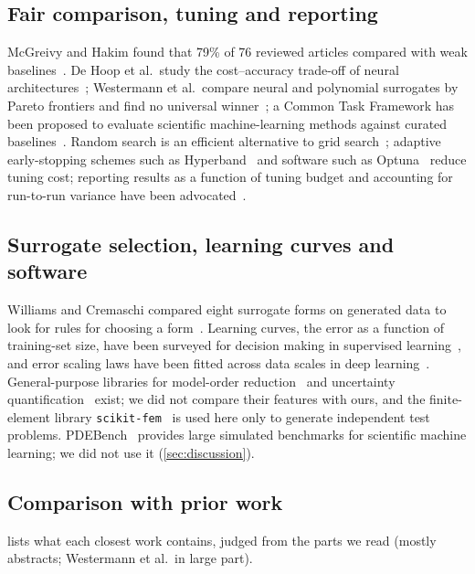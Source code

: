 \subsection{Fair comparison, tuning and reporting}
McGreivy and Hakim found that 79\% of 76 reviewed articles compared with weak baselines~\cite{mcgreivy2024}. De Hoop et al.\ study the cost--accuracy trade-off of neural architectures~\cite{dehoop2022}; Westermann et al.\ compare neural and polynomial surrogates by Pareto frontiers and find no universal winner~\cite{westermann2026}; a Common Task Framework has been proposed to evaluate scientific machine-learning methods against curated baselines~\cite{wyder2025}. Random search is an efficient alternative to grid search~\cite{bergstra2012}; adaptive early-stopping schemes such as Hyperband~\cite{li2018hyperband} and software such as Optuna~\cite{akiba2019} reduce tuning cost; reporting results as a function of tuning budget and accounting for run-to-run variance have been advocated~\cite{dodge2019,bouthillier2021}.

\subsection{Surrogate selection, learning curves and software}
Williams and Cremaschi compared eight surrogate forms on generated data to look for rules for choosing a form~\cite{williams2019}. Learning curves, the error as a function of training-set size, have been surveyed for decision making in supervised learning~\cite{mohr2024}, and error scaling laws have been fitted across data scales in deep learning~\cite{rosenfeld2020}. General-purpose libraries for model-order reduction~\cite{milk2016} and uncertainty quantification~\cite{marelli2014} exist; we did not compare their features with ours, and the finite-element library \texttt{scikit-fem}~\cite{gustafsson2020} is used here only to generate independent test problems. PDEBench~\cite{takamoto2022} provides large simulated benchmarks for scientific machine learning; we did not use it (\cref{sec:discussion}).

\subsection{Comparison with prior work}
 lists what each closest work contains, judged from the parts we read (mostly abstracts; Westermann et al.\ in large part).
\begin{table}[t]\centering\caption{Closest related work. A dash means that we did not find the property in the parts we read (mostly abstracts); it does not prove absence.}\label{tab:related}\scriptsize\setlength{\tabcolsep}{2pt}\resizebox{\textwidth}{!}{}\end{table}

